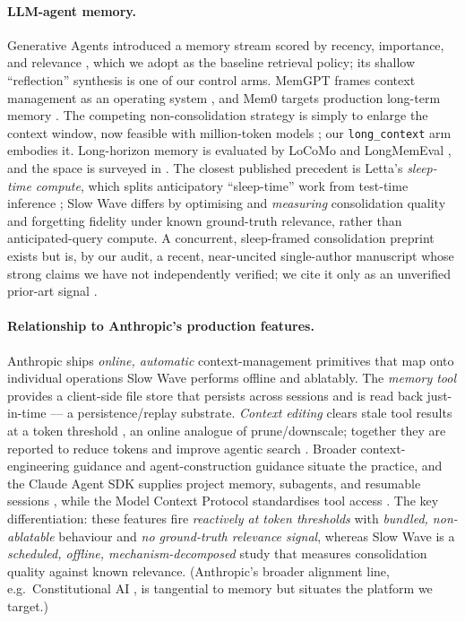 \paragraph{LLM-agent memory.} Generative Agents introduced a memory stream
scored by recency, importance, and relevance \citep{park2023generativeagents},
which we adopt as the baseline retrieval policy; its shallow ``reflection''
synthesis is one of our control arms. MemGPT frames context management as an
operating system \citep{packer2023memgpt}, and Mem0 targets production long-term
memory \citep{chhikara2025mem0}. The competing non-consolidation strategy is
simply to enlarge the context window, now feasible with million-token models
\citep{gemini2024}; our \texttt{long\_context} arm embodies it. Long-horizon memory is evaluated by LoCoMo
\citep{maharana2024locomo} and LongMemEval \citep{wu2025longmemeval}, and the
space is surveyed in \citet{zhang2025memorysurvey}. The closest published
precedent is Letta's \emph{sleep-time compute}, which splits anticipatory
``sleep-time'' work from test-time inference \citep{lin2025sleeptime}; Slow Wave
differs by optimising and \emph{measuring} consolidation quality and forgetting
fidelity under known ground-truth relevance, rather than anticipated-query
compute. A concurrent, sleep-framed consolidation preprint exists but is, by our
audit, a recent, near-uncited single-author manuscript whose strong claims we
have not independently verified; we cite it only as an unverified prior-art
signal \citep[unverified;][]{xie2026forget}.

\paragraph{Relationship to Anthropic's production features.} Anthropic ships
\emph{online, automatic} context-management primitives that map onto individual
operations Slow Wave performs offline and ablatably. The \emph{memory tool}
provides a client-side file store that persists across sessions and is read back
just-in-time \citep{anthropic_memorytool} --- a persistence/replay substrate.
\emph{Context editing} clears stale tool results at a token threshold
\citep{anthropic_contextediting}, an online analogue of prune/downscale; together
they are reported to reduce tokens and improve agentic search
\citep{anthropic_contextmgmt}. Broader context-engineering guidance
\citep{anthropic_contextengineering} and agent-construction guidance
\citep{schluntz2024agents,hadfield2025multiagent} situate the practice, and the
Claude Agent SDK supplies project memory, subagents, and resumable sessions
\citep{anthropic_agentsdk}, while the Model Context Protocol standardises tool
access \citep{anthropic_mcp}. The key differentiation: these features fire
\emph{reactively at token thresholds} with \emph{bundled, non-ablatable}
behaviour and \emph{no ground-truth relevance signal}, whereas Slow Wave is a
\emph{scheduled, offline, mechanism-decomposed} study that measures consolidation
quality against known relevance. (Anthropic's broader alignment line, e.g.\
Constitutional AI \citep{bai2022cai}, is tangential to memory but situates the
platform we target.)

